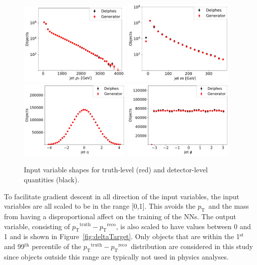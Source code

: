 \documentclass[showpacs,showkeys,preprint,prd,nofootinbib,linenumbers,12pt]{revtex4-1}
\def\pt{\ensuremath{p_{\mathrm{T}}}}
\def\ptRes{\ensuremath{\pt^{\mathrm{truth}}-\pt^{\mathrm{reco}}}}
\begin{document}
\begin{figure}[h]
  \includegraphics[width=0.48\textwidth]{jet_pT_prescaling_log.pdf}
  \includegraphics[width=0.48\textwidth]{jet_m_prescaling_log.pdf}\\
  \includegraphics[width=0.48\textwidth]{jet_eta_prescaling.pdf}
  \includegraphics[width=0.48\textwidth]{jet_phi_prescaling.pdf}
  \caption{Input variable shapes for truth-level (red) and detector-level quantities (black).}
  \label{fig:nnInputsPrescaling}
\end{figure}

To facilitate gradient descent in all direction of the input variables, the input variables are all scaled to be in the range [0,1]. This avoids the \pt\ and the mass from having a disproportional affect on the training of the NNs. The output variable, consisting of \ptRes, is also scaled to have values between 0 and 1 and is shown in Figure~\ref{fig:deltaTarget}. Only objects that 
are within the 1$^{\mathrm{st}}$ and 99$^{\mathrm{th}}$ percentile of the \ptRes\ distribution are considered in this study since objects outside this range are typically not used in physics analyses.
\end{document}
